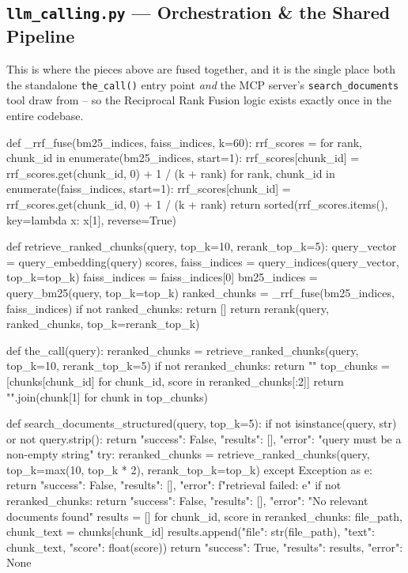 \documentclass[11pt,a4paper]{article}
\begin{document}
\subsection{\texttt{llm\_calling.py} --- Orchestration \& the Shared Pipeline}

This is where the pieces above are fused together, and it is the single
place both the standalone \texttt{the\_call()} entry point \emph{and} the MCP
server's \texttt{search\_documents} tool draw from -- so the Reciprocal Rank
Fusion logic exists exactly once in the entire codebase.

\begin{pycode}
def _rrf_fuse(bm25_indices, faiss_indices, k=60):
    rrf_scores = {}
    for rank, chunk_id in enumerate(bm25_indices, start=1):
        rrf_scores[chunk_id] = rrf_scores.get(chunk_id, 0) + 1 / (k + rank)
    for rank, chunk_id in enumerate(faiss_indices, start=1):
        rrf_scores[chunk_id] = rrf_scores.get(chunk_id, 0) + 1 / (k + rank)
    return sorted(rrf_scores.items(), key=lambda x: x[1], reverse=True)

def retrieve_ranked_chunks(query, top_k=10, rerank_top_k=5):
    query_vector = query_embedding(query)
    scores, faiss_indices = query_indices(query_vector, top_k=top_k)
    faiss_indices = faiss_indices[0]
    bm25_indices = query_bm25(query, top_k=top_k)
    ranked_chunks = _rrf_fuse(bm25_indices, faiss_indices)
    if not ranked_chunks:
        return []
    return rerank(query, ranked_chunks, top_k=rerank_top_k)

def the_call(query):
    reranked_chunks = retrieve_ranked_chunks(query, top_k=10, rerank_top_k=5)
    if not reranked_chunks:
        return ""
    top_chunks = [chunks[chunk_id] for chunk_id, score in reranked_chunks[:2]]
    return "\n\n".join(chunk[1] for chunk in top_chunks)

def search_documents_structured(query, top_k=5):
    if not isinstance(query, str) or not query.strip():
        return {"success": False, "results": [], "error": "query must be a non-empty string"}
    try:
        reranked_chunks = retrieve_ranked_chunks(query, top_k=max(10, top_k * 2), rerank_top_k=top_k)
    except Exception as e:
        return {"success": False, "results": [], "error": f"retrieval failed: {e}"}
    if not reranked_chunks:
        return {"success": False, "results": [], "error": "No relevant documents found"}
    results = []
    for chunk_id, score in reranked_chunks:
        file_path, chunk_text = chunks[chunk_id]
        results.append({"file": str(file_path), "text": chunk_text, "score": float(score)})
    return {"success": True, "results": results, "error": None}
\end{pycode}
\end{document}
